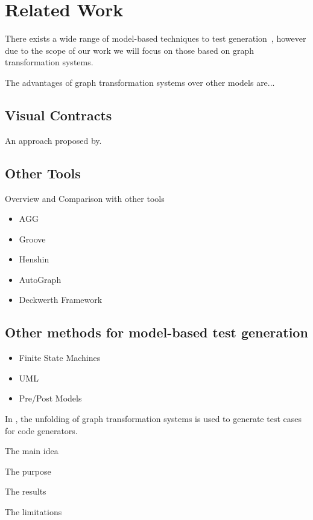 \chapter{Related Work}\label{ch:related-work}

There exists a wide range of model-based techniques to test generation~\cite{Utting2006}, however due to the scope of our work we will focus on those based on graph transformation systems.

The advantages of graph transformation systems over other models are...

\section{Visual Contracts}

An approach proposed by.



\section{Other Tools}

Overview and Comparison with other tools

\begin{itemize}
\item AGG
\item Groove
\item Henshin
\item AutoGraph
\item Deckwerth Framework
\end{itemize}

\section{Other methods for model-based test generation}

\begin{itemize}
  \item Finite State Machines
  \item UML
  \item Pre/Post Models
\end{itemize}

In \cite{Baldan2004}, the unfolding of graph transformation systems is used to generate test cases for code generators. 

The main idea

The purpose

The results

The limitations

\cite{Runge2013}
